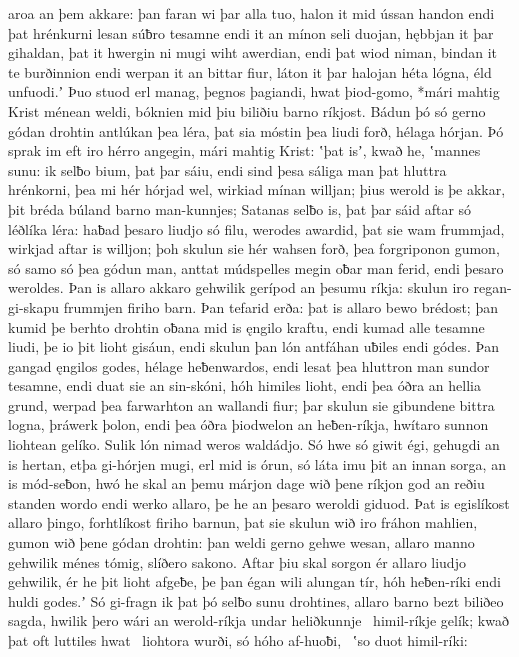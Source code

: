 aroa an þem akkare: þan faran wi þar alla tuo,
halon it mid ússan handon endi þat hrénkurni lesan
súƀro tesamne endi it an mínon seli duojan,
hębbjan it þar gihaldan, þat it hwergin ni mugi
wiht awerdian, endi þat wiod niman,
bindan it te burðinnion endi werpan it an bittar fiur,
láton it þar halojan héta lógna,
éld unfuodi.ʼ Þuo stuod erl manag,
þegnos þagiandi, hwat þiod-gomo,
*mári mahtig Krist ménean weldi,
bóknien mid þiu biliðiu barno ríkjost.
Bádun þó só gerno gódan drohtin
antlúkan þea léra, þat sia móstin þea liudi forð,
hélaga hórjan. Þó sprak im eft iro hérro angegin,
mári mahtig Krist: ʽþat isʼ, kwað he, ʽmannes sunu:
ik selƀo bium, þat þar sáiu, endi sind þesa sáliga man
þat hluttra hrénkorni, þea mi hér hórjad wel,
wirkiad mínan willjan; þius werold is þe akkar,
þit bréda búland barno man-kunnjes;
Satanas selƀo is, þat þar sáid aftar
só léðlíka léra: haƀad þesaro liudjo só filu,
werodes awardid, þat sie wam frummjad,
wirkjad aftar is willjon; þoh skulun sie hér wahsen forð,
þea forgriponon gumon, só samo só þea gódun man,
anttat múdspelles megin oƀar man ferid,
endi þesaro weroldes. Þan is allaro akkaro gehwilik
gerípod an þesumu ríkja: skulun iro regan-gi-skapu
frummjen firiho barn. Þan tefarid erða:
þat is allaro bewo brédost; þan kumid þe berhto drohtin
oƀana mid is ęngilo kraftu, endi kumad alle tesamne
liudi, þe io þit lioht gisáun, endi skulun þan lón antfáhan
uƀiles endi gódes. Þan gangad ęngilos godes,
hélage heƀenwardos, endi lesat þea hluttron man
sundor tesamne, endi duat sie an sin-skóni,
hóh himiles lioht, endi þea óðra an hellia grund,
werpad þea farwarhton an wallandi fiur;
þar skulun sie gibundene bittra logna,
þráwerk þolon, endi þea óðra þiodwelon
an heƀen-ríkja, hwítaro sunnon
liohtean gelíko. Sulik lón nimad
weros waldádjo. Só hwe só giwit égi,
gehugdi an is hertan, etþa gi-hórjen mugi,
erl mid is órun, só láta imu þit an innan sorga,
an is mód-seƀon, hwó he skal an þemu márjon dage
wið þene ríkjon god an reðiu standen
wordo endi werko allaro, þe he an þesaro weroldi giduod.
Þat is egislíkost allaro þingo,
forhtlíkost firiho barnun, þat sie skulun wið iro fráhon mahlien,
gumon wið þene gódan drohtin: þan weldi gerno gehwe wesan,
allaro manno gehwilik ménes tómig,
slíðero sakono. Aftar þiu skal sorgon ér
allaro liudjo gehwilik, ér he þit lioht afgeƀe,
þe þan égan wili alungan tír,
hóh heƀen-ríki endi huldi godes.ʼ
Só gi-fragn ik þat þó selƀo sunu drohtines,
allaro barno bezt biliðeo sagda,
hwilik þero wári an werold-ríkja
undar heliðkunnje \hld\ himil-ríkje gelík;
kwað þat oft luttiles hwat \hld\ liohtora wurði,
só hóho af-huoƀi, \hld\ ʽso duot himil-ríki:
